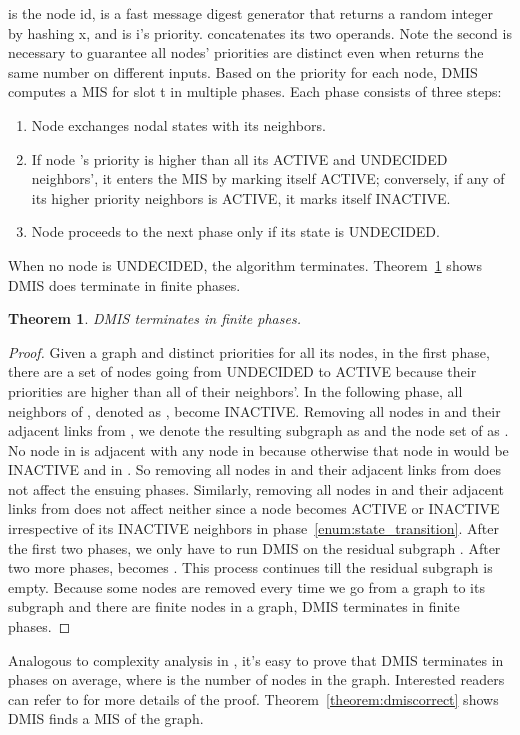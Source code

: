 \documentclass[conference]{IEEEtran}
\newtheorem{theorem}{Theorem}
\begin{document}
 is the node id,  is a fast message digest generator that returns a random integer by hashing x, and  is i's priority.  concatenates its two operands. Note the second  is necessary to guarantee all nodes' priorities are distinct even when  returns the same number on different inputs. Based on the priority for each node, DMIS computes a MIS for slot t in multiple phases. Each phase consists of three steps:
\begin{enumerate}
  \item Node  exchanges nodal states with its neighbors. \label{enum:state_exchange} \item If node 's priority is higher than all its ACTIVE and UNDECIDED neighbors', it enters the MIS by marking itself ACTIVE; conversely, if any of its higher priority neighbors is ACTIVE, it marks itself INACTIVE.	\label{enum:state_transition}
  \item Node  proceeds to the next phase only if its state is UNDECIDED.
\end{enumerate}
When no node is UNDECIDED, the algorithm terminates.
Theorem~\ref{theorem:dmisconvergence} shows DMIS does terminate in finite phases.
\begin{theorem}		\label{theorem:dmisconvergence}
DMIS terminates in finite phases.
\end{theorem}
\begin{proof}
Given a graph  and distinct priorities for all its nodes, in the first phase, there are a set of nodes  going from UNDECIDED to ACTIVE because their priorities are higher than all of their neighbors'. In the following phase, all neighbors of , denoted as , become INACTIVE. Removing all nodes in  and their adjacent links from , we denote the resulting subgraph as  and the node set of  as . No node in  is adjacent with any node in  because otherwise that node in  would be INACTIVE and in . So removing all nodes in  and their adjacent links from  does not affect the ensuing phases. Similarly, removing all nodes in  and their adjacent links from  does not affect neither since a node becomes ACTIVE or INACTIVE irrespective of its INACTIVE neighbors in phase~\ref{enum:state_transition}. After the first two phases, we only have to run DMIS on the residual subgraph . After two more phases,  becomes . This process continues till the residual subgraph is empty. Because some nodes are removed every time we go from a graph to its subgraph and there are finite nodes in a graph, DMIS terminates in finite phases.
\end{proof}
Analogous to complexity analysis in \cite{fastmisv2}, it's easy to prove that DMIS terminates in  phases on average, where  is the number of nodes in the graph. Interested readers can refer to \cite{fastmisv2} for more details of the proof. Theorem~\ref{theorem:dmiscorrect} shows DMIS finds a MIS of the graph.
\end{document}
